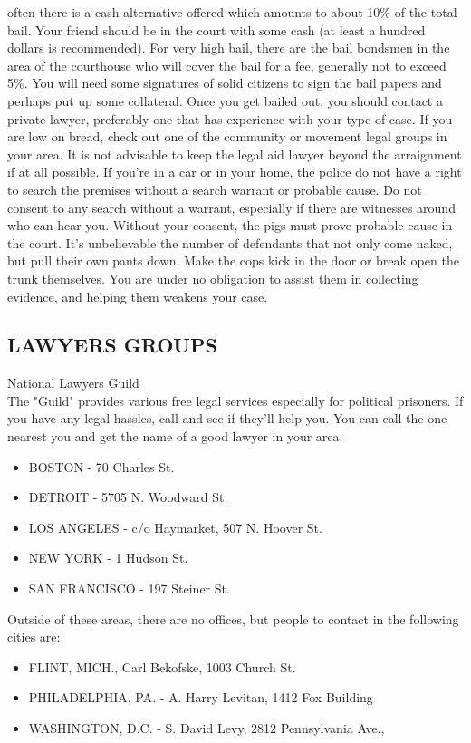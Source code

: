 \documentclass[11pt,twoside,a4paper]{book}
\begin{document}
often there is a cash alternative offered which amounts to about 10\% of the total bail. Your friend should be in the court with some cash (at least a hundred dollars is recommended). For very high bail, there are the bail bondsmen in the area of the courthouse who will cover the bail for a fee, generally not to exceed 5\%. You will need some signatures of solid citizens to sign the bail papers and perhaps put up some collateral. Once you get bailed out, you should contact a private lawyer, preferably one that has experience with your type of case. If you are low on bread, check out one of the community or movement legal groups in your area. It is not advisable to keep the legal aid lawyer beyond the arraignment if at all possible. If you're in a car or in your home, the police do not have a right to search the premises without a search warrant or probable cause. Do not consent to any search without a warrant, especially if there are witnesses around who can hear you. Without your consent, the pigs must prove probable cause in the court. It's unbelievable the number of defendants that not only come naked, but pull their own pants down. Make the cops kick in the door or break open the trunk themselves. You are under no obligation to assist them in collecting evidence, and helping them weakens your case. 

\subsection{LAWYERS GROUPS}

National Lawyers Guild~\\
The "Guild" provides various free legal services especially for political prisoners. If you have any legal hassles, call and see if they'll help you. You can call the one nearest you and get the name of a good lawyer in your area. 
\begin{itemize}
	\item BOSTON - 70 Charles St. 
	\item DETROIT - 5705 N. Woodward St. 
	\item LOS ANGELES - c/o Haymarket, 507 N. Hoover St. 
	\item NEW YORK - 1 Hudson St.
	\item SAN FRANCISCO - 197 Steiner St.
\end{itemize}
Outside of these areas, there are no offices, but people to contact in the following cities are:
\begin{itemize}
	\item FLINT, MICH., Carl Bekofske, 1003 Church St. 
	\item PHILADELPHIA, PA. - A. Harry Levitan, 1412 Fox Building 
	\item WASHINGTON, D.C. - S. David Levy, 2812 Pennsylvania Ave., 
\end{itemize}
\end{document}
